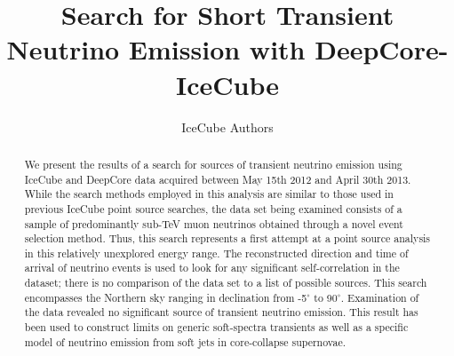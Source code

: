 \documentclass[manuscript]{aastex}
\begin{document}

\title{Search for Short Transient Neutrino Emission with DeepCore-IceCube}
\author{IceCube Authors}

\begin{abstract}
We present the results of a search for sources of transient neutrino emission using IceCube and DeepCore data acquired between May 15th 2012 and April 30th 2013. While the search methods employed in this analysis are similar to those used in previous IceCube point source searches, the data set being examined consists of a sample of predominantly sub-TeV muon neutrinos obtained through a novel event selection method. Thus, this search represents a first attempt at a point source analysis in this relatively unexplored energy range. The reconstructed direction and time of arrival of neutrino events is used to look for any significant self-correlation in the dataset; there is no comparison of the data set to a list of possible sources. This search encompasses the Northern sky ranging in declination from -5$^{\circ}$ to 90$^{\circ}$. Examination of the data revealed no significant source of transient neutrino emission. This result has been used to construct limits on generic soft-spectra transients as well as a specific model of neutrino emission from soft jets in core-collapse supernovae.
\end{abstract}


\end{document}
